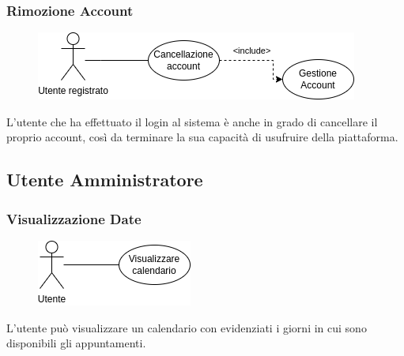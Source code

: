 \documentclass{article}
\begin{document}
\subsubsection{Rimozione Account}\label{rf_9}
\begin{description}

	\begin{figure}[htp]
	\centering
	\includegraphics[]{rf9.png}
	\end{figure}

    \item L'utente che ha effettuato il login al sistema è anche in grado di cancellare il proprio account, così da terminare la sua capacità di usufruire della piattaforma.
\end{description}

\clearpage

\subsection{Utente Amministratore}

\renewcommand\thesubsubsection{RF \arabic{subsubsection}}
\subsubsection{Visualizzazione Date}\label{rf_1}
\begin{description}
    
    \begin{figure}[htp]
	\centering
	\includegraphics[]{rf1.png}
	\end{figure}
    
    \item L'utente può visualizzare un calendario con evidenziati i giorni in cui sono disponibili gli appuntamenti. 
\end{description}

\renewcommand\thesubsubsection{RF 3}
\end{document}
